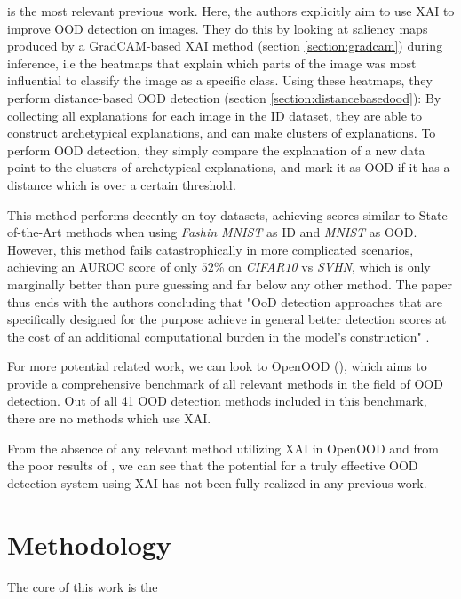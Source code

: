\documentclass[UKenglish]{uiomasterthesis} %
\theoremstyle{definition}
\begin{document}
\cite{martinez} is the most relevant previous work. Here, the authors explicitly aim to use XAI to improve OOD detection on images. They do this by looking at saliency maps produced by a GradCAM-based XAI method (section \ref{section:gradcam}) during inference, i.e the heatmaps that explain which parts of the image was most influential to classify the image as a specific class. Using these heatmaps, they perform distance-based OOD detection (section \ref{section:distancebasedood}): By collecting all explanations for each image in the ID dataset, they are able to construct archetypical explanations, and can make clusters of explanations. To perform OOD detection, they simply compare the explanation of a new data point to the clusters of archetypical explanations, and mark it as OOD if it has a distance which is over a certain threshold.

This method performs decently on toy datasets, achieving scores similar to State-of-the-Art methods when using {\it Fashin MNIST} as ID and {\it MNIST} as OOD. However, this method fails catastrophically in more complicated scenarios, achieving an AUROC score of only $52\%$ on {\it CIFAR10} vs {\it SVHN}, which is only marginally better than pure guessing and far below any other method. The paper thus ends with the authors concluding that "OoD detection approaches that are specifically designed for the purpose achieve in general better detection scores at the cost of an additional computational burden in the model’s construction" \cite{martinez}.

For more potential related work, we can look to OpenOOD (\cite{openood}), which aims to provide a comprehensive benchmark of all relevant methods in the field of OOD detection. Out of all 41 OOD detection methods included in this benchmark, there are no methods which use XAI.

From the absence of any relevant method utilizing XAI in OpenOOD and from the poor results of \cite{martinez}, we can see that the potential for a truly effective OOD detection system using XAI has not been fully realized in any previous work.

\chapter{Methodology}

The core of this work is the 
\end{document}

